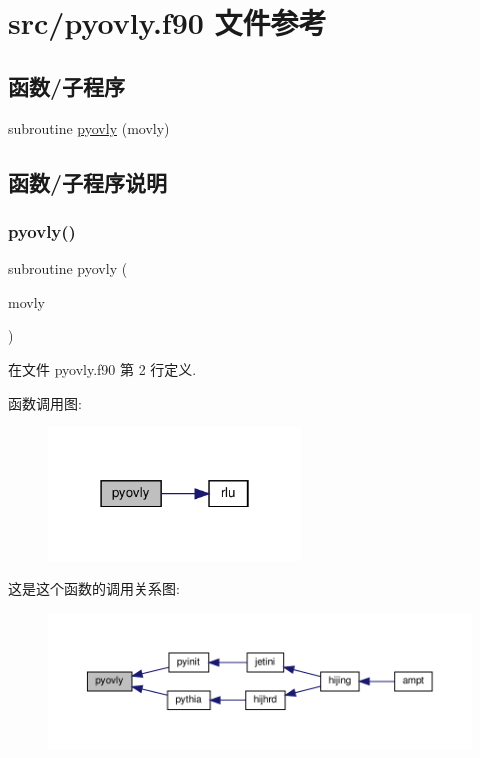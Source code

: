 \hypertarget{pyovly_8f90}{}\section{src/pyovly.f90 文件参考}
\label{pyovly_8f90}
\subsection*{函数/子程序}
\begin{DoxyCompactItemize}
\item 
subroutine \mbox{\hyperlink{pyovly_8f90_a2aa0bbf0f9ce7b3b5a1fe5fb341664ac}{pyovly}} (movly)
\end{DoxyCompactItemize}


\subsection{函数/子程序说明}
\mbox{\label{pyovly_8f90_a2aa0bbf0f9ce7b3b5a1fe5fb341664ac}} 
\subsubsection{\texorpdfstring{pyovly()}{pyovly()}}
{\footnotesize\ttfamily subroutine pyovly (\begin{DoxyParamCaption}\item[{}]{movly }\end{DoxyParamCaption})}



在文件 pyovly.\+f90 第 2 行定义.

函数调用图\+:
\nopagebreak
\begin{figure}[H]
\begin{center}
\leavevmode
\includegraphics[width=190pt]{pyovly_8f90_a2aa0bbf0f9ce7b3b5a1fe5fb341664ac_cgraph}
\end{center}
\end{figure}
这是这个函数的调用关系图\+:
\nopagebreak
\begin{figure}[H]
\begin{center}
\leavevmode
\includegraphics[width=350pt]{pyovly_8f90_a2aa0bbf0f9ce7b3b5a1fe5fb341664ac_icgraph}
\end{center}
\end{figure}
